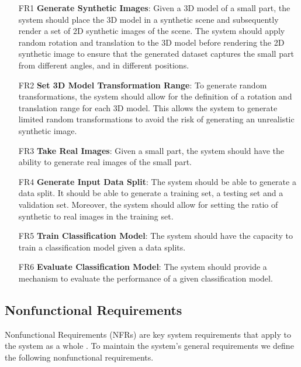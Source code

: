 \begin{itemize}
  \item [FR1] \textbf{Generate Synthetic Images}: Given a 3D model of a small part, the system should place the 3D model in a synthetic scene and subsequently render a set of 2D synthetic images of the scene. The system should apply random rotation and translation to the 3D model before rendering the 2D synthetic image to ensure that the generated dataset captures the small part from different angles, and in different positions.

  \item [FR2] \textbf{Set 3D Model Transformation Range}: To generate random transformations, the system should allow for the definition of a rotation and translation range for each 3D model. This allows the system to generate limited random transformations to avoid the risk of generating an unrealistic synthetic image.

  \item [FR3] \textbf{Take Real Images}: Given a small part, the system should have the ability to generate real images of the small part.

  \item [FR4] \textbf{Generate Input Data Split}: The system should be able to generate a data split. It should be able to generate a training set, a testing set and a validation set. Moreover, the system should allow for setting the ratio of synthetic to real images in the training set.

  \item [FR5] \textbf{Train Classification Model}: The system should have the capacity to train a classification model given a data splits.

  \item [FR6] \textbf{Evaluate Classification Model}: The system should provide a mechanism to evaluate the performance of a given classification model.


\end{itemize}

\subsection{Nonfunctional Requirements}

Nonfunctional Requirements (NFRs) are key system requirements that apply to the system as a whole \cite{bruegge2004object}. To maintain the system's general requirements we define the following nonfunctional requirements.

